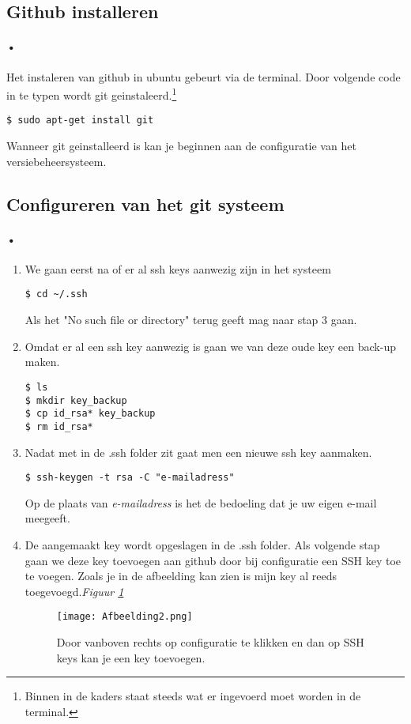 \documentclass[12pt,a4paper]{report}
\begin{document}
\subsection{Github installeren}
\paragraph{•}
Het instaleren van github in ubuntu gebeurt via de terminal. Door volgende code in te typen wordt git geinstaleerd.\footnote{Binnen in de kaders staat steeds wat er ingevoerd moet worden in de terminal.}
\begin{lstlisting}[frame=BTrl]
$ sudo apt-get install git
\end{lstlisting}
Wanneer git geinstalleerd is kan je beginnen aan de configuratie van het versiebeheersysteem.

\subsection{Configureren van het git systeem}
\paragraph{•}
\begin{enumerate}
    \item 
We gaan eerst na of er al ssh keys aanwezig zijn in het systeem 
\begin{lstlisting}[frame=BTrl]
$ cd ~/.ssh
\end{lstlisting}
Als het "No such file or directory" terug geeft mag naar stap 3 gaan.
    \item 
Omdat er al een ssh key aanwezig is gaan we van deze oude key een back-up maken.
\begin{lstlisting}[frame=BTrl]
$ ls
$ mkdir key_backup
$ cp id_rsa* key_backup
$ rm id_rsa*
\end{lstlisting}
    \item 
Nadat met in de .ssh folder zit gaat men een nieuwe ssh key aanmaken.
\begin{lstlisting}[frame=BTrl]
$ ssh-keygen -t rsa -C "e-mailadress"
\end{lstlisting}
Op de plaats van \emph{e-mailadress} is het de bedoeling dat je uw eigen e-mail meegeeft.
	\item
De aangemaakt key wordt opgeslagen in de .ssh folder. Als volgende stap gaan we deze key toevoegen aan github door bij configuratie een SSH key toe te voegen. Zoals je in de afbeelding kan zien is mijn key al reeds toegevoegd.\emph{Figuur \ref{afbeelding2}}
\begin{figure} [h]
\texttt{[image: Afbeelding2.png]}
\caption[Toevoegen Key]{Door vanboven rechts op configuratie te klikken en dan op SSH keys kan je een key toevoegen.}
\label{afbeelding2}
\end{figure}
\end{enumerate}
\end{document}

